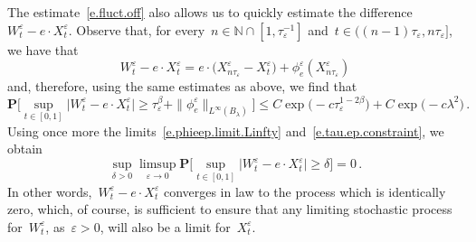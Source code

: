 \documentclass[11pt,twoside]{article} %
\numberwithin{equation}{section}
\theoremstyle{definition}
\newcommand*{\N}{\ensuremath{\mathbb{N}}}
\newcommand{\eps}{\varepsilon}
\newcommand{\ep}{\eps}
\begin{document}
\smallskip

The estimate~\eqref{e.fluct.off} also allows us to quickly estimate the difference~$W^\ep_t - e\cdot X^{\ep}_t$. 
Observe that, for every~$n\in \N\cap [1, \tau_\ep^{-1}]$ and~$t \in ( (n-1) \tau_\ep, n\tau_\ep]$, we have that 
\begin{equation*}
W^\ep_t - e\cdot X^{\ep}_t
=
e\cdot \bigl( X^\ep_{n\tau_\ep} - X^\ep_t \bigr) 
+
\phi_e^\ep(X^\ep_{n\tau_\ep })
\end{equation*}
and, therefore, using the same estimates as above, we find that 
\begin{equation*}
\mathbf{P} 
\biggl[ 
\sup_{ t \in [0,1] } 
\bigl| W^\ep_t - e\cdot X^{\ep}_t \bigr| 
\geq \tau_\ep^{\beta} + \| \phi^\ep_e\|_{L^\infty(B_\lambda)}
\biggr]
\leq 
C \exp \bigl( -c\tau_\ep^{1-2\beta} \bigr) 
+
C \exp \bigl( -c\lambda^2  \bigr)
\,.
\end{equation*}
Using once more the limits~\eqref{e.phieep.limit.Linfty} and~\eqref{e.tau.ep.constraint}, we obtain
\begin{equation}
\label{e.Wept.to.Xept}
\sup_{\delta>0} \limsup_{\ep \to 0}
\mathbf{P} 
\biggl[ 
\sup_{ t \in [0,1] } 
\bigl| W^\ep_t - e\cdot X^{\ep}_t \bigr| 
\geq \delta 
\biggr] = 0
\,.
\end{equation}
In other words,~$W^\ep_t - e\cdot X^\ep_t$ converges in law to the process which is identically zero, which, of course, is sufficient to ensure that any limiting stochastic process for~$W^\ep_t$, as~$\ep>0$, will also be a limit for~$X^\ep_t$. 

\smallskip
\end{document}

